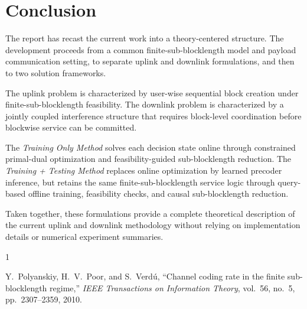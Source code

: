 \documentclass[11pt]{article}
\begin{document}
\section{Conclusion}

The report has recast the current work into a theory-centered structure. The
development proceeds from a common finite-sub-blocklength model and payload
communication setting, to separate uplink and downlink formulations, and then
to two solution frameworks.

The uplink problem is characterized by user-wise sequential block creation under
finite-sub-blocklength feasibility. The downlink problem is characterized by a
jointly coupled interference structure that requires block-level coordination
before blockwise service can be committed.

The \emph{Training Only Method} solves each decision state online through
constrained primal-dual optimization and feasibility-guided sub-blocklength
reduction. The \emph{Training + Testing Method} replaces online optimization by
learned precoder inference, but retains the same finite-sub-blocklength service
logic through query-based offline training, feasibility checks, and causal
sub-blocklength reduction.

Taken together, these formulations provide a complete theoretical description of
the current uplink and downlink methodology without relying on implementation
details or numerical experiment summaries.

\begin{thebibliography}{1}

Y.~Polyanskiy, H.~V.~Poor, and S.~Verd\'u,
``Channel coding rate in the finite sub-blocklength regime,''
\emph{IEEE Transactions on Information Theory},
vol.~56, no.~5, pp.~2307--2359, 2010.

\end{thebibliography}
\end{document}
